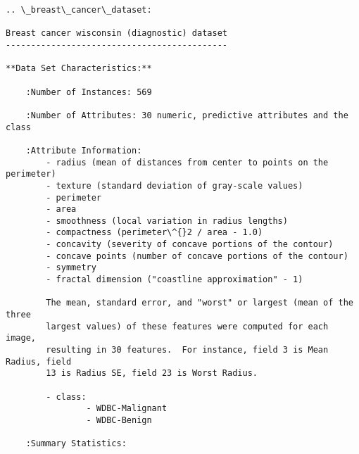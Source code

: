 \documentclass[11pt]{article}
\begin{document}
    \begin{Verbatim}[commandchars=\\\{\}]
.. \_breast\_cancer\_dataset:

Breast cancer wisconsin (diagnostic) dataset
--------------------------------------------

**Data Set Characteristics:**

    :Number of Instances: 569

    :Number of Attributes: 30 numeric, predictive attributes and the class

    :Attribute Information:
        - radius (mean of distances from center to points on the perimeter)
        - texture (standard deviation of gray-scale values)
        - perimeter
        - area
        - smoothness (local variation in radius lengths)
        - compactness (perimeter\^{}2 / area - 1.0)
        - concavity (severity of concave portions of the contour)
        - concave points (number of concave portions of the contour)
        - symmetry 
        - fractal dimension ("coastline approximation" - 1)

        The mean, standard error, and "worst" or largest (mean of the three
        largest values) of these features were computed for each image,
        resulting in 30 features.  For instance, field 3 is Mean Radius, field
        13 is Radius SE, field 23 is Worst Radius.

        - class:
                - WDBC-Malignant
                - WDBC-Benign

    :Summary Statistics:


\end{Verbatim}
\end{document}
